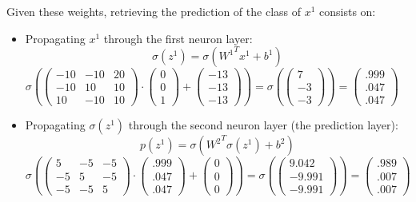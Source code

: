		Given these weights, retrieving the prediction of the class of $x^1$ consists on: 
		\begin{itemize}
			\item Propagating $x^1$ through the first neuron layer:
			$$ \sigma(z^1) = \sigma({W^1}^T x^1 + b^1) $$
			$ \sigma \left(
			\left( \begin{matrix} -10 & -10 & 20 \\ -10 & 10 & 10 \\ 10 & -10 & 10 \end{matrix}\right) \cdot
			\left( \begin{matrix} 0  \\ 0  \\ 1  \end{matrix}\right) +
			\left( \begin{matrix} -13 \\ -13 \\ -13 \end{matrix}\right) \right) = 
			\sigma \left( 
			\left( \begin{matrix} 7 \\ -3 \\ -3 \end{matrix}\right) \right) = 
			\left( \begin{matrix} .999 \\ .047 \\ .047 \end{matrix}\right) $
			\item Propagating $\sigma(z^1)$ through the second neuron layer (the prediction layer):
			$$ p(z^1) = \sigma({W^2}^T \sigma(z^1) + b^2) $$
			$ \sigma \left(
			\left( \begin{matrix} 5 & -5 & -5 \\ -5 & 5 & -5 \\ -5 & -5 & 5 \end{matrix}\right) \cdot
			\left( \begin{matrix} .999  \\ .047  \\ .047  \end{matrix}\right) +
			\left( \begin{matrix} 0 \\ 0 \\ 0 \end{matrix}\right) \right) = 
			\sigma \left( 
			\left( \begin{matrix} 9.042 \\ -9.991 \\ -9.991 \end{matrix}\right) \right) = 
			\left( \begin{matrix} .989 \\ .007 \\ .007 \end{matrix}\right) $
		\end{itemize}

